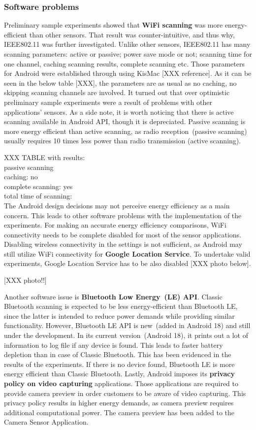 \subsubsection{Software problems}
Preliminary sample experiments showed that \textbf{WiFi scanning} was more energy-efficient than other sensors. That result was counter-intuitive, and thus why, IEEE802.11 was further investigated. Unlike other sensors, IEEE802.11 has many scanning parameters: active or passive; power save mode or not; scanning time for one channel, caching scanning results, complete scanning etc. Those parameters for Android were established through using KisMac [XXX reference]. As it can be seen in the below table [XXX], the parameters are as usual as no caching, no skipping  scanning channels are involved. It turned out that over optimistic preliminary sample experiments were a result of problems with other applications' sensors. As a side note, it is worth noticing that there is active scanning available in Android API, though it is depreciated. Passive scanning is more energy efficient than active scanning, as radio reception\ (passive scanning) usually requires 10 times less power than radio transmission (active scanning).


XXX TABLE with results:\\
passive scanning\\
caching: no\\
complete scanning: yes\\
total time of scanning:\\


The Android design decisions may not perceive energy efficiency as a main concern. This leads to other software problems with the implementation of the experiments. For making an accurate energy efficiency comparisons, WiFi connectivity needs to be complete disabled for most of the sensor applications. Disabling wireless connectivity in the settings is not sufficient, as Android may still utilize WiFi connectivity for \textbf{Google Location Service}. To undertake valid experiments, Google Location Service has to be also disabled [XXX photo below].

[XXX photo!!]

Another software issue is \textbf{Bluetooth Low Energy\ (LE) API}. Classic Bluetooth scanning is expected to be less energy-efficient than Bluetooth LE, since the latter is intended to reduce power demands while providing similar functionality. However, Bluetooth LE API is new\ (added in Android 18) and still under the development. In its current version\ (Android 18),  it prints out a lot of information to log file if any device is found. This leads to faster battery depletion than in case of Classic Bluetooth. This has been evidenced in the results of the experiments. If there is no device found, Bluetooth LE is more energy efficient than Classic Bluetooth. Lastly, Android imposes its \textbf{privacy policy on video capturing} applications. Those applications are required to provide camera preview in order customers to be aware of video capturing. This privacy policy results in higher energy demands, as camera preview requires additional computational power. The camera preview has been added to the Camera Sensor Application.
		
